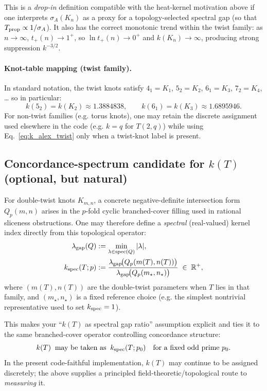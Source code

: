 \documentclass[11pt,a4paper]{article}
\begin{document}
        This is a \emph{drop-in} definition compatible with the heat-kernel motivation above if one interprets
        $\sigma_A(K_n)$ as a proxy for a topology-selected spectral gap (so that $T_{\rm prop}\propto 1/\sigma_A$).
        It also has the correct monotonic trend within the twist family: as $n\to\infty$, $t_+(n)\to 1^+$,
        so $\ln t_+(n)\to 0^+$ and $k(K_n)\to\infty$, producing strong suppression $k^{-3/2}$.
        \cite{Lee2025DoubleTwist}

        \paragraph{Knot-table mapping (twist family).}
        In standard notation, the twist knots satisfy $4_1=K_1$, $5_2=K_2$, $6_1=K_3$, $7_2=K_4$, \ldots
        so in particular:
        \[
            k(5_2)=k(K_2)\approx 1.3884838,
            \qquad
            k(6_1)=k(K_3)\approx 1.6895946.
        \]
        For non-twist families (e.g. torus knots), one may retain the discrete assignment used elsewhere in the code
        (e.g. $k=q$ for $T(2,q)$) while using Eq.~\eqref{eq:k_alex_twist} only when a twist-knot label is present.

        \subsection*{Concordance-spectrum candidate for $k(T)$ (optional, but natural)}

        For double-twist knots $K_{m,n}$, a concrete negative-definite intersection form
        $Q_p(m,n)$ arises in the $p$-fold cyclic branched-cover filling used in rational sliceness
        obstructions. One may therefore define a \emph{spectral} (real-valued) kernel index
        directly from this topological operator:
        \begin{align}
            \lambda_{\rm gap}(Q) &:= \min_{\lambda\in{\rm spec}(Q)} |\lambda|, \\
            k_{\rm spec}(T;p) &:= \frac{\lambda_{\rm gap}\!\big(Q_p(m(T),n(T))\big)}
                                     {\lambda_{\rm gap}\!\big(Q_p(m_\star,n_\star)\big)} \;\in\;\mathbb{R}^+,
        \end{align}
        where $(m(T),n(T))$ are the double-twist parameters when $T$ lies in that family, and
        $(m_\star,n_\star)$ is a fixed reference choice (e.g. the simplest nontrivial representative used
        to set $k_{\rm spec}=1$).

        This makes your ``$k(T)$ as spectral gap ratio'' assumption explicit and ties it to the same
        branched-cover operator controlling concordance structure:
        \[
            k(T)\;\;\text{may be taken as}\;\;k_{\rm spec}(T;p_0)\quad\text{for a fixed odd prime }p_0.
        \]
        In the present code-faithful implementation, $k(T)$ may continue to be assigned discretely; the
        above supplies a principled field-theoretic/topological route to \emph{measuring} it.
\end{document}
